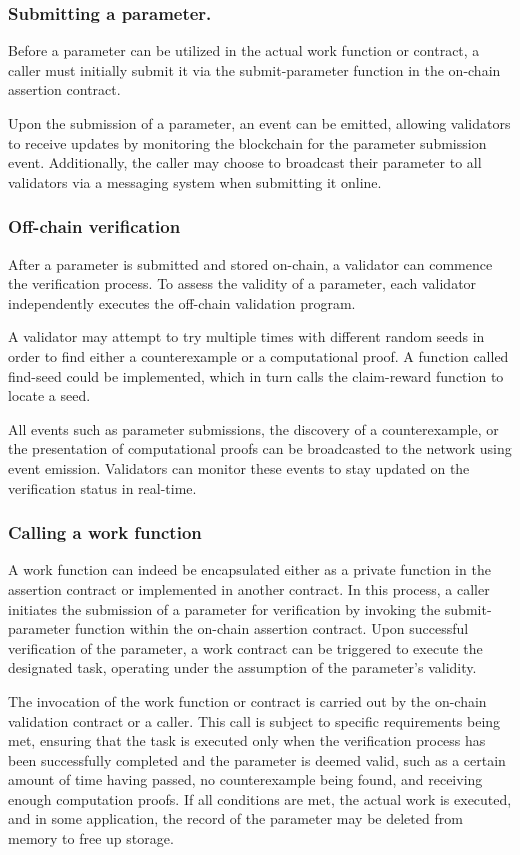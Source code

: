 \documentclass[runningheads]{llncs}
\begin{document}
\subsubsection{Submitting a parameter.} 
Before a parameter can be utilized in the actual work function or contract, a caller must initially submit it via the submit-parameter function in the on-chain assertion contract. 

Upon the submission of a parameter, an event can be emitted, allowing validators to receive updates by monitoring the blockchain for the parameter submission event. Additionally, the caller may choose to broadcast their parameter to all validators via a messaging system when submitting it online.
\subsubsection{Off-chain verification}
After a parameter is submitted and stored on-chain, a validator can commence the verification process. To assess the validity of a parameter, each validator independently executes the off-chain validation program.

A validator may attempt to try multiple times with different random seeds in order to find either a counterexample or a computational proof. A function called find-seed could be implemented, which in turn calls the claim-reward function to locate a seed.

All events such as parameter submissions, the discovery of a counterexample, or the presentation of computational proofs can be broadcasted to the network using event emission. Validators can monitor these events to stay updated on the verification status in real-time. 
\subsubsection{Calling a work function}
A work function can indeed be encapsulated either as a private function in the assertion contract or implemented in another contract. In this process, a caller initiates the submission of a parameter for verification by invoking the submit-parameter function within the on-chain assertion contract. Upon successful verification of the parameter, a work contract can be triggered to execute the designated task, operating under the assumption of the parameter's validity.

The invocation of the work function or contract is carried out by the on-chain validation contract or a caller. This call is subject to specific requirements being met, ensuring that the task is executed only when the verification process has been successfully completed and the parameter is deemed valid, such as a certain amount of time having passed, no counterexample being found, and receiving enough computation proofs. If all conditions are met, the actual work is executed, and in some application, the record of the parameter may be deleted from memory to free up storage.
\end{document}
